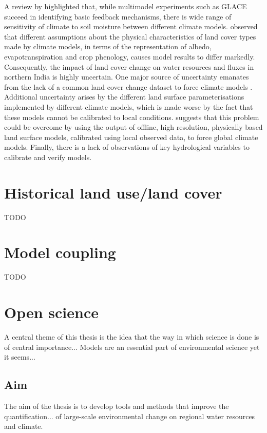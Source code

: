 \documentclass{icldt}\usepackage[]{graphicx}\usepackage[]{color}
\begin{document}
A review by \citet{Seneviratne2010} highlighted that, while multimodel experiments such as GLACE succeed in identifying basic feedback mechanisms, there is wide range of sensitivity of climate to soil moisture between different climate models. \citet{Pitman2009} observed that different assumptions about the physical characteristics of land cover types made by climate models, in terms of the representation of albedo, evapotranspiration and crop phenology, causes model results to differ markedly. Consequently, the impact of land cover change on water resources and fluxes in northern India is highly uncertain. One major source of uncertainty emanates from the lack of a common land cover change dataset to force climate models \citep{Pitman2009}. Additional uncertainty arises by the different land surface parameterisations implemented by different climate models, which is made worse by the fact that these models cannot be calibrated to local conditions. \citet{Seneviratne2010} suggests that this problem could be overcome by using the output of offline, high resolution, physically based land surface models, calibrated using local observed data, to force global climate models. Finally, there is a lack of observations of key hydrological variables to calibrate and verify models. \\

\section{Historical land use/land cover}
TODO

\section{Model coupling}
TODO

\section{Open science}
A central theme of this thesis is the idea that the way in which science is done is of central importance... Models are an essential part of environmental science yet it seems... \\

\subsection{Aim}
The aim of the thesis is to develop tools and methods that improve the quantification... of large-scale environmental change on regional water resources and climate. 
\end{document}
